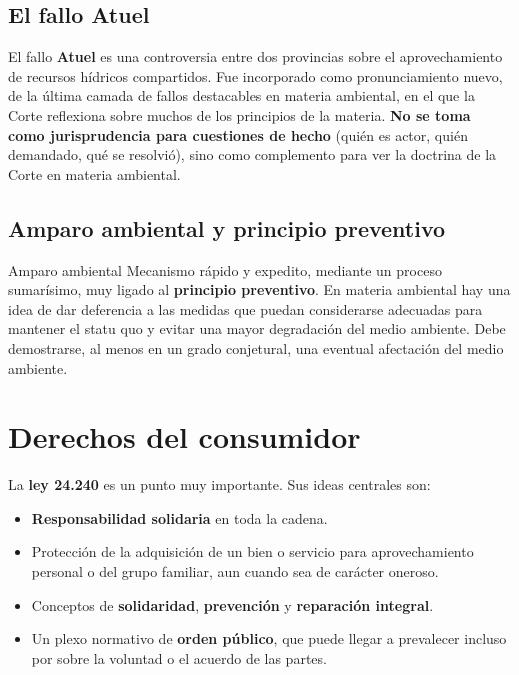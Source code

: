 \documentclass[12pt,oneside]{book}
\begin{document}
\subsection{El fallo Atuel}

El fallo \textbf{Atuel} es una controversia entre dos provincias sobre el aprovechamiento de recursos hídricos compartidos. Fue incorporado como pronunciamiento nuevo, de la última camada de fallos destacables en materia ambiental, en el que la Corte reflexiona sobre muchos de los principios de la materia. \textbf{No se toma como jurisprudencia para cuestiones de hecho} (quién es actor, quién demandado, qué se resolvió), sino como complemento para ver la doctrina de la Corte en materia ambiental.

\subsection{Amparo ambiental y principio preventivo}

\begin{definition}{Amparo ambiental}
Mecanismo rápido y expedito, mediante un proceso sumarísimo, muy ligado al \textbf{principio preventivo}. En materia ambiental hay una idea de dar deferencia a las medidas que puedan considerarse adecuadas para mantener el statu quo y evitar una mayor degradación del medio ambiente. Debe demostrarse, al menos en un grado conjetural, una eventual afectación del medio ambiente.
\end{definition}

\section{Derechos del consumidor}

La \textbf{ley 24.240} es un punto muy importante. Sus ideas centrales son:
\begin{itemize}
    \item \textbf{Responsabilidad solidaria} en toda la cadena.
    \item Protección de la adquisición de un bien o servicio para aprovechamiento personal o del grupo familiar, aun cuando sea de carácter oneroso.
    \item Conceptos de \textbf{solidaridad}, \textbf{prevención} y \textbf{reparación integral}.
    \item Un plexo normativo de \textbf{orden público}, que puede llegar a prevalecer incluso por sobre la voluntad o el acuerdo de las partes.
\end{itemize}
\end{document}
